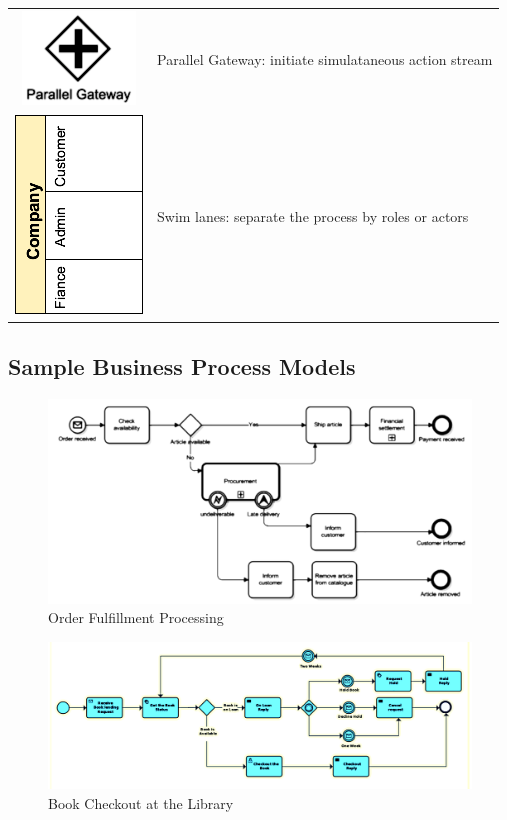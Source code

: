 \documentclass[]{book}
\begin{document}
\begin{longtable}[]{@{}cl@{}}
\includegraphics{images/parallel-gateway.png} & Parallel Gateway: initiate simulataneous action stream\tabularnewline
\includegraphics{images/swimlanes.png} & Swim lanes: separate the process by roles or actors\tabularnewline
\bottomrule
\end{longtable}

\hypertarget{sample-business-process-models}{%
\subsection{Sample Business Process Models}\label{sample-business-process-models}}

\begin{figure}
\centering
\includegraphics{images/orderfulfillment.png}
\caption{Order Fulfillment Processing}
\end{figure}

\begin{figure}
\centering
\includegraphics{images/bookckout.png}
\caption{Book Checkout at the Library}
\end{figure}
\end{document}
